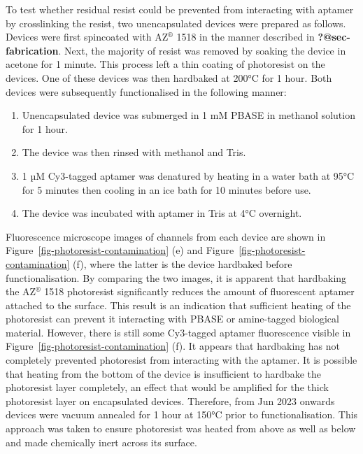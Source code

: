 \documentclass[
  a4paper,
]{scrbook}
\begin{document}
To test whether residual resist could be prevented from interacting with
aptamer by crosslinking the resist, two unencapsulated devices were
prepared as follows. Devices were first spincoated with AZ\(^\circledR\)
1518 in the manner described in \textbf{?@sec-fabrication}. Next, the
majority of resist was removed by soaking the device in acetone for 1
minute. This process left a thin coating of photoresist on the devices.
One of these devices was then hardbaked at 200°C for 1 hour. Both
devices were subsequently functionalised in the following manner:

\begin{enumerate}
\def\labelenumi{\arabic{enumi}.}
\item
  Unencapsulated device was submerged in 1 mM PBASE in methanol solution
  for 1 hour.
\item
  The device was then rinsed with methanol and Tris.
\item
  1 µM Cy3-tagged aptamer was denatured by heating in a water bath at
  95°C for 5 minutes then cooling in an ice bath for 10 minutes before
  use.
\item
  The device was incubated with aptamer in Tris at 4°C overnight.
\end{enumerate}

Fluorescence microscope images of channels from each device are shown in
Figure~\ref{fig-photoresist-contamination} (e) and
Figure~\ref{fig-photoresist-contamination} (f), where the latter is the
device hardbaked before functionalisation. By comparing the two images,
it is apparent that hardbaking the AZ\(^\circledR\) 1518 photoresist
significantly reduces the amount of fluorescent aptamer attached to the
surface. This result is an indication that sufficient heating of the
photoresist can prevent it interacting with PBASE or amine-tagged
biological material. However, there is still some Cy3-tagged aptamer
fluorescence visible in Figure~\ref{fig-photoresist-contamination} (f).
It appears that hardbaking has not completely prevented photoresist from
interacting with the aptamer. It is possible that heating from the
bottom of the device is insufficient to hardbake the photoresist layer
completely, an effect that would be amplified for the thick photoresist
layer on encapsulated devices. Therefore, from Jun 2023 onwards devices
were vacuum annealed for 1 hour at 150°C prior to functionalisation.
This approach was taken to ensure photoresist was heated from above as
well as below and made chemically inert across its surface.
\end{document}
